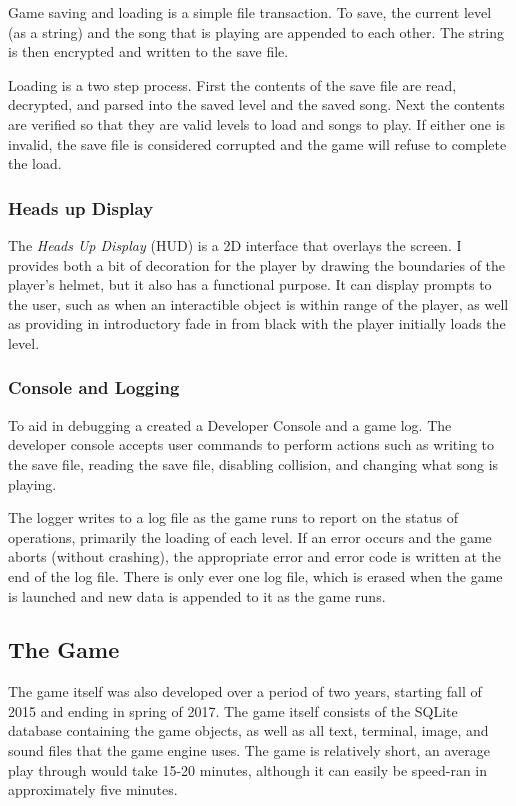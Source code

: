 \documentclass{article}
\begin{document}
Game saving and loading is a simple file transaction. To save, the current level (as a string) and the song that is playing are appended to each other. The string is then encrypted and written to the save file.

Loading is a two step process. First the contents of the save file are read, decrypted, and parsed into the saved level and the saved song. Next the contents are verified so that they are valid levels to load and songs to play. If either one is invalid, the save file is considered corrupted and the game will refuse to complete the load.

\subsubsection{Heads up Display} \label{subsubsec:HUD}

The \emph{Heads Up Display} (HUD) is a 2D interface that overlays the screen. I provides both a bit of decoration for the player by drawing the boundaries of the player's helmet, but it also has a functional purpose. It can display prompts to the user, such as when an interactible object is within range of the player, as well as providing in introductory fade in from black with the player initially loads the level.

\subsubsection{Console and Logging} \label{subsubsec:console}

To aid in debugging a created a Developer Console and a game log. The developer console accepts user commands to perform actions such as writing to the save file, reading the save file, disabling collision, and changing what song is playing.

The logger writes to a log file as the game runs to report on the status of operations, primarily the loading of each level. If an error occurs and the game aborts (without crashing), the appropriate error and error code is written at the end of the log file. There is only ever one log file, which is erased when the game is launched and new data is appended to it as the game runs.

\subsection{The Game} \label{subsec:thegame}

The game itself was also developed over a period of two years, starting fall of 2015 and ending in spring of 2017. The game itself consists of the SQLite database containing the game objects, as well as all text, terminal, image, and sound files that the game engine uses. The game is relatively short, an average play through would take 15-20 minutes, although it can easily be speed-ran in approximately five minutes.
\end{document}
